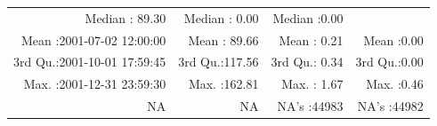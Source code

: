 \documentclass[
  10pt,
  a4paper,oneside]{article}
\begin{document}
\begin{longtable}[]{@{}rrrr@{}}
\begin{minipage}[t]{0.19\columnwidth}
Median : 89.30\strut
\end{minipage} & \begin{minipage}[t]{0.18\columnwidth}\raggedleft
Median : 0.00\strut
\end{minipage} & \begin{minipage}[t]{0.18\columnwidth}\raggedleft
Median :0.00\strut
\end{minipage}\tabularnewline
\begin{minipage}[t]{0.34\columnwidth}\raggedleft
Mean :2001-07-02 12:00:00\strut
\end{minipage} & \begin{minipage}[t]{0.19\columnwidth}\raggedleft
Mean : 89.66\strut
\end{minipage} & \begin{minipage}[t]{0.18\columnwidth}\raggedleft
Mean : 0.21\strut
\end{minipage} & \begin{minipage}[t]{0.18\columnwidth}\raggedleft
Mean :0.00\strut
\end{minipage}\tabularnewline
\begin{minipage}[t]{0.34\columnwidth}\raggedleft
3rd Qu.:2001-10-01 17:59:45\strut
\end{minipage} & \begin{minipage}[t]{0.19\columnwidth}\raggedleft
3rd Qu.:117.56\strut
\end{minipage} & \begin{minipage}[t]{0.18\columnwidth}\raggedleft
3rd Qu.: 0.34\strut
\end{minipage} & \begin{minipage}[t]{0.18\columnwidth}\raggedleft
3rd Qu.:0.00\strut
\end{minipage}\tabularnewline
\begin{minipage}[t]{0.34\columnwidth}\raggedleft
Max. :2001-12-31 23:59:30\strut
\end{minipage} & \begin{minipage}[t]{0.19\columnwidth}\raggedleft
Max. :162.81\strut
\end{minipage} & \begin{minipage}[t]{0.18\columnwidth}\raggedleft
Max. : 1.67\strut
\end{minipage} & \begin{minipage}[t]{0.18\columnwidth}\raggedleft
Max. :0.46\strut
\end{minipage}\tabularnewline
\begin{minipage}[t]{0.34\columnwidth}\raggedleft
NA\strut
\end{minipage} & \begin{minipage}[t]{0.19\columnwidth}\raggedleft
NA\strut
\end{minipage} & \begin{minipage}[t]{0.18\columnwidth}\raggedleft
NA's :44983\strut
\end{minipage} & \begin{minipage}[t]{0.18\columnwidth}\raggedleft
NA's :44982\strut
\end{minipage}\tabularnewline
\bottomrule
\end{longtable}
\end{document}
